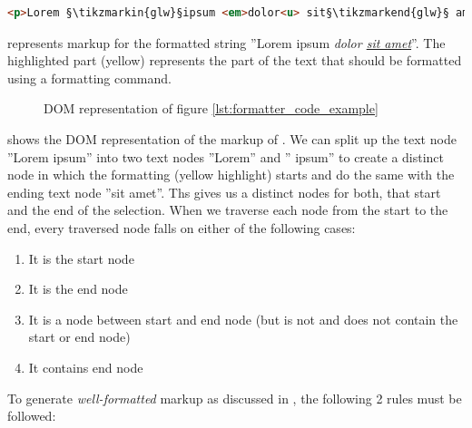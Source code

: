 \begin{lstlisting}[language=html, caption=Markup with highlighted target for formatting, label=lst:formatter_code_example]
<p>Lorem §\tikzmarkin{glw}§ipsum <em>dolor<u> sit§\tikzmarkend{glw}§ amet</u></em></p>
\end{lstlisting}

 represents markup for the formatted string ''Lorem ipsum \textit{dolor \underline{sit amet}}''. The highlighted part (yellow) represents the part of the text that should be formatted using a formatting command.

\begin{figure}[!htb]
\centering
{}
\caption{DOM representation of figure \ref{lst:formatter_code_example}}
\label{fig:formatting_dom_tree}
\end{figure}

 shows the DOM representation of the markup of . We can split up the text node ''Lorem ipsum'' into two text nodes ''Lorem'' and '' ipsum'' to create a distinct node in which the formatting (yellow highlight) starts and do the same with the ending text node ''sit amet''. Ths gives us a distinct nodes for both, that start and the end of the selection. When we traverse each node from the start to the end, every traversed node falls on either of the following cases:

\begin{enumerate}
\item It is the start node
\item It is the end node
\item It is a node between start and end node (but is not and does not contain the start or end node)
\item It contains end node
\end{enumerate}

\noindent To generate \textit{well-formatted} markup as discussed in , the following 2 rules must be followed:

